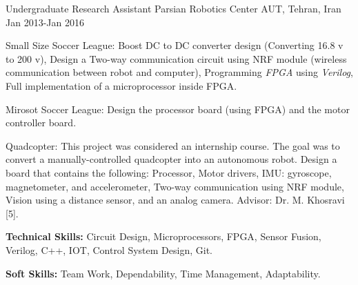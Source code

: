 \begin{cventries}
  \cventry
 {Undergraduate Research Assistant}  %
    {Parsian Robotics Center} %
    {AUT, Tehran, Iran} %
    {Jan 2013-Jan 2016} %
    {
          \begin{cvitems} %
            \item {Small Size Soccer League:	Boost DC to DC converter design (Converting 16.8 v to 200 v),	Design a Two-way communication circuit using NRF module (wireless communication between robot and computer), Programming \textit{FPGA} using \textit{Verilog}, Full implementation of a microprocessor inside FPGA.}
            \item {Mirosot Soccer League:	Design the processor board (using FPGA) and the motor controller board.}
            \item{Quadcopter: This project was considered an internship course. The goal was to convert a manually-controlled quadcopter into an autonomous robot. Design a board that contains the following: Processor, Motor drivers, IMU: gyroscope, magnetometer, and accelerometer, Two-way communication using NRF module, Vision using a distance sensor, and an analog camera. Advisor: Dr. M. Khosravi [5].}
            \item {\textbf{Technical Skills:} Circuit Design, Microprocessors, FPGA, Sensor Fusion, Verilog, C++, IOT, Control System Design, Git.}
        \item {\textbf{Soft Skills:} Team Work, Dependability, Time Management, Adaptability.}
          \end{cvitems}
    }
\end{cventries}


